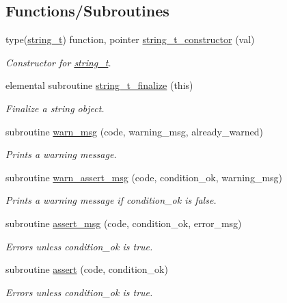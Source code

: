 \subsection*{Functions/\+Subroutines}
\begin{DoxyCompactItemize}
\item 
type(\mbox{\hyperlink{structpmc__util_1_1string__t}{string\+\_\+t}}) function, pointer \mbox{\hyperlink{namespacepmc__util_a8fc2639b0e044d6e575027b5394061aa}{string\+\_\+t\+\_\+constructor}} (val)
\begin{DoxyCompactList}\small\item\em Constructor for \mbox{\hyperlink{structpmc__util_1_1string__t}{string\+\_\+t}}. \end{DoxyCompactList}\item 
elemental subroutine \mbox{\hyperlink{namespacepmc__util_a25291e39623c22ba97600388d04ef7a0}{string\+\_\+t\+\_\+finalize}} (this)
\begin{DoxyCompactList}\small\item\em Finalize a string object. \end{DoxyCompactList}\item 
subroutine \mbox{\hyperlink{namespacepmc__util_a249b73ad660e5e17ec4e4ad2ff743546}{warn\+\_\+msg}} (code, warning\+\_\+msg, already\+\_\+warned)
\begin{DoxyCompactList}\small\item\em Prints a warning message. \end{DoxyCompactList}\item 
subroutine \mbox{\hyperlink{namespacepmc__util_aca11f4bf2897a638ee7035dcc39e7524}{warn\+\_\+assert\+\_\+msg}} (code, condition\+\_\+ok, warning\+\_\+msg)
\begin{DoxyCompactList}\small\item\em Prints a warning message if condition\+\_\+ok is false. \end{DoxyCompactList}\item 
subroutine \mbox{\hyperlink{namespacepmc__util_ab4f813625900c9949db11067af2224f2}{assert\+\_\+msg}} (code, condition\+\_\+ok, error\+\_\+msg)
\begin{DoxyCompactList}\small\item\em Errors unless condition\+\_\+ok is true. \end{DoxyCompactList}\item 
subroutine \mbox{\hyperlink{namespacepmc__util_a4b6a3270c45469ecd16abc4c2c43e391}{assert}} (code, condition\+\_\+ok)
\begin{DoxyCompactList}\small\item\em Errors unless condition\+\_\+ok is true. \end{DoxyCompactList}\item 

\end{DoxyCompactItemize}

